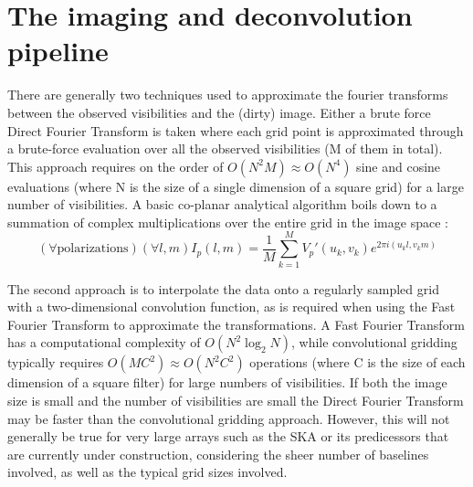  \section{The imaging and deconvolution pipeline}
 There are generally two techniques used to approximate the fourier transforms between the observed visibilities and the (dirty) image. Either a brute force Direct Fourier Transform is taken where each grid point is approximated through a brute-force
 evaluation over all the observed visibilities (M of them in total). This approach requires on the order of $O(N^2M) \approx O(N^4)$ sine and cosine evaluations (where N is the size of a single dimension of a square grid) for a large number of visibilities. A basic co-planar analytical 
 algorithm boils down to a summation of complex multiplications over the entire grid in the image space \cite[Lecture 7]{taylor1999synthesis}: 
 \begin{equation}
  (\forall \text{polarizations})(\forall l,m) I_{p}(l,m) = \frac{1}{M}\sum_{k=1}^{M}{V_p'(u_k,v_k)e^{2\pi i (u_kl,v_km)}}
 \end{equation}
 
 The second approach is to interpolate the data onto a regularly sampled grid with a two-dimensional convolution function, as is required when using the Fast Fourier Transform to approximate the transformations. A Fast Fourier Transform has a computational complexity of $O(N^2\log_2{N})$, while
 convolutional gridding typically requires $O(MC^2) \approx O(N^2C^2)$ operations (where C is the size of each dimension of a square filter) for large numbers of visibilities. If both the image size is small and the number of visibilities 
 are small the Direct Fourier Transform may be faster than the convolutional gridding approach. However, this will not generally be true for very large arrays such as the SKA or its predicessors that are currently under construction, 
 considering the sheer number of baselines involved, as well as the typical grid sizes involved.
 
